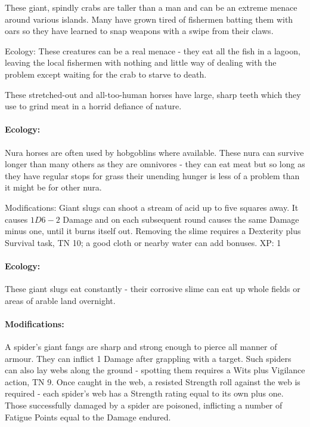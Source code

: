 These giant, spindly crabs are taller than a man and can be an extreme menace around various islands.  Many have grown tired of fishermen batting them with oars so they have learned to snap weapons with a swipe from their claws.

Ecology: These creatures can be a real menace - they eat all the fish in a lagoon, leaving the local fishermen with nothing and little way of dealing with the problem except waiting for the crab to starve to death.


\label{nura_horse}
\nurahorse

These stretched-out and all-too-human horses have large, sharp teeth which they use to grind meat in a horrid defiance of nature.

\paragraph{Ecology:} Nura horses are often used by hobgoblins where available.  These nura can survive longer than many others as they are omnivores - they can eat meat but so long as they have regular stops for grass their unending hunger is less of a problem than it might be for other nura.

\label{nura_slug}
\nuraslug

Modifications: Giant slugs can shoot a stream of acid up to five squares away.  It causes $1D6-2$ Damage and on each subsequent round causes the same Damage minus one, until it burns itself out.  Removing the slime requires a Dexterity plus Survival task, TN 10; a good cloth or nearby water can add bonuses. XP: 1

\paragraph{Ecology:} These giant slugs eat constantly - their corrosive slime can eat up whole fields or areas of arable land overnight.

\label{nura_spider}

\nuraspider

\paragraph{Modifications:} A spider's giant fangs are sharp and strong enough to pierce all manner of armour.  They can inflict 1 Damage after grappling with a target.  Such spiders can also lay webs along the ground - spotting them requires a Wits plus Vigilance action, TN 9.  Once caught in the web, a resisted Strength roll against the web is required - each spider's web has a Strength rating equal to its own plus one.  Those successfully damaged by a spider are poisoned, inflicting a number of Fatigue Points equal to the Damage endured.

